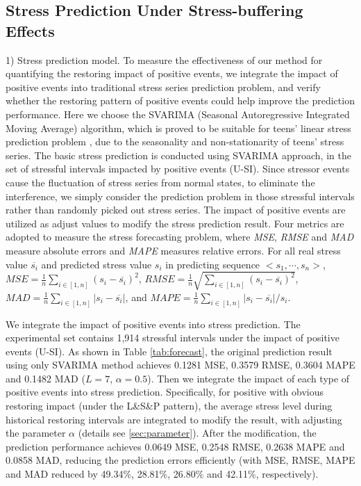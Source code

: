\subsection{Stress Prediction Under Stress-buffering Effects}
1) Stress prediction model.
To measure the effectiveness of our method for quantifying the restoring impact of positive events,
we integrate the impact of positive events into traditional stress series prediction problem,
and verify whether the restoring pattern of positive events could help improve the prediction performance.
Here we choose the SVARIMA (Seasonal Autoregressive Integrated Moving Average) algorithm,
which is proved to be suitable for teens' linear stress prediction problem \citep{Shumway2006Time, Li2015Predicting},
due to the seasonality and non-stationarity of teens' stress series.
The basic stress prediction is conducted using SVARIMA approach,
in the set of stressful intervals impacted by positive events (U-SI).
Since stressor events cause the fluctuation of stress series from normal states,
to eliminate the interference,
we simply consider the prediction problem in those stressful intervals rather than randomly picked out stress series.
The impact of positive events are utilized as adjust values to modify the stress prediction result.
Four metrics are adopted to measure the stress forecasting problem,
where \emph{MSE}, \emph{RMSE} and \emph{MAD} measure absolute errors and \emph{MAPE} measures relative errors.
For all real stress value $\overline{s_i}$ and predicted stress value $s_i$ in predicting sequence $<s_1,\cdots,s_n>$,
$MSE = \frac{1}{n}\sum_{i\in[1,n]}(s_i-\overline{s_i})^2$,
$RMSE = \frac{1}{n}\sqrt{\sum_{i\in[1,n]}(s_i-\overline{s_i})^2}$,
$MAD = \frac{1}{n}\sum_{i\in[1,n]}|s_i-\overline{s_i}|$,
and $MAPE = \frac{1}{n}\sum_{i\in[1,n]}{|s_i-\overline{s_i}|/s_i}$.

We integrate the impact of positive events into stress prediction.
The experimental set contains 1,914 stressful intervals under the impact of positive events (U-SI).
As shown in Table \ref{tab:forecast},
the original prediction result using only SVARIMA method
achieves 0.1281 MSE, 0.3579 RMSE, 0.3604 MAPE and 0.1482 MAD ($L = 7$, $\alpha = 0.5$).
Then we integrate the impact of each type of positive events into stress prediction.
Specifically, for positive with obvious restoring impact (under the L\&S\&P pattern),
the average stress level during historical restoring intervals are integrated to modify the result,
with adjusting the parameter $\alpha$ (details see \ref{sec:parameter}).
After the modification,
the prediction performance achieves 0.0649 MSE,	0.2548 RMSE, 0.2638 MAPE and 0.0858 MAD,
reducing the prediction errors efficiently (with MSE, RMSE, MAPE and MAD reduced by 49.34\%, 28.81\%, 26.80\% and 42.11\%, respectively).

